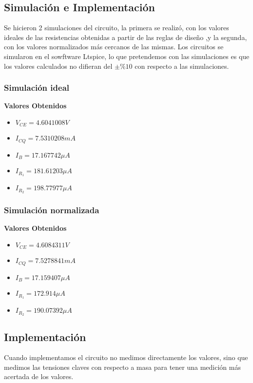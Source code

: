 \begin{multicols}{2}
		\subsection{Simulación e Implementación}
        \sangria{}Se hicieron 2 simulaciones del circuito, la primera se realizó, con los valores ideales de las resistencias obtenidas a partir de las reglas de diseño ,y la segunda, con los valores normalizados más cercanos de las mismas. Los circuitos se simularon en el sowftware Ltspice, lo que pretendemos con las simulaciones es que los valores calculados no difieran del $\pm \%10$ con respecto a las simulaciones.

			\subsubsection{Simulación ideal}

				\textbf{Valores Obtenidos}
                \begin{itemize}[nosep]
					\item $V_{CE} = 4.6041008 V$
					\item $I_{CQ}= 7.5310208 mA$
					\item $I_B = 17.167742\mu A$
					\item $I_{R_1} = 181.61203\mu A$
					\item $I_{R_2} = 198.77977\mu A$
				\end{itemize}
			\subsubsection{Simulación normalizada}

				\textbf{Valores Obtenidos}
                \begin{itemize}[nosep]
					\item $V_{CE} = 4.6084311 V$
					\item $I_{CQ}= 7.5278841 mA$
					\item $I_B = 17.159407\mu A$
					\item $I_{R_1} = 172.914\mu A$
					\item $I_{R_2} = 190.07392\mu A$
				\end{itemize}

		\subsection{Implementación}
			\sangria{}Cuando implementamos el circuito no medimos directamente los valores, sino que medimos las tensiones claves con respecto a masa para tener una medición más acertada de los valores.


\end{multicols}
